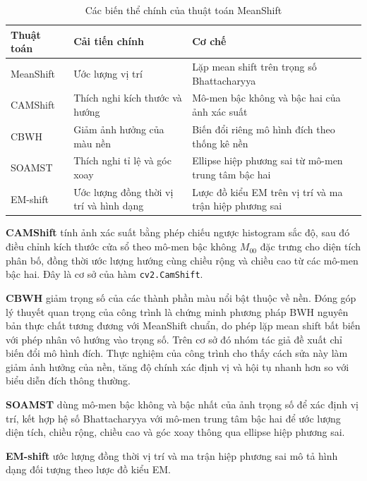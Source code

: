 \documentclass[12pt,a4paper]{article}
\numberwithin{equation}{section}
\begin{document}
\begin{table}[H]
\centering
\caption{Các biến thể chính của thuật toán MeanShift}
\label{tab:variants}
\small
\begin{tabular}{@{}lp{4.1cm}p{6.4cm}@{}}
\toprule
\textbf{Thuật toán} & \textbf{Cải tiến chính} & \textbf{Cơ chế} \\
\midrule
MeanShift~\cite{comaniciu2003} & Ước lượng vị trí & Lặp mean shift trên trọng số Bhattacharyya \\
CAMShift~\cite{bradski1998} & Thích nghi kích thước và hướng & Mô-men bậc không và bậc hai của ảnh xác suất \\
CBWH~\cite{ning2012cbwh} & Giảm ảnh hưởng của màu nền & Biến đổi riêng mô hình đích theo thống kê nền \\
SOAMST~\cite{ning2012soamst} & Thích nghi tỉ lệ và góc xoay & Ellipse hiệp phương sai từ mô-men trung tâm bậc hai \\
EM-shift~\cite{zivkovic2004} & Ước lượng đồng thời vị trí và hình dạng & Lược đồ kiểu EM trên vị trí và ma trận hiệp phương sai \\
\bottomrule
\end{tabular}
\end{table}

\textbf{CAMShift} tính ảnh xác suất bằng phép chiếu ngược histogram sắc độ, sau đó điều chỉnh kích
thước cửa sổ theo mô-men bậc không $M_{00}$ đặc trưng cho diện tích phân bố, đồng thời ước lượng
hướng cùng chiều rộng và chiều cao từ các mô-men bậc hai. Đây là cơ sở của hàm
\texttt{cv2.CamShift}.

\textbf{CBWH} giảm trọng số của các thành phần màu nổi bật thuộc về nền. Đóng góp lý thuyết quan
trọng của công trình là chứng minh phương pháp BWH nguyên bản thực chất tương đương với MeanShift
chuẩn, do phép lặp mean shift bất biến với phép nhân vô hướng vào trọng số. Trên cơ sở đó nhóm tác
giả đề xuất chỉ biến đổi mô hình đích. Thực nghiệm của công trình cho thấy cách sửa này làm giảm
ảnh hưởng của nền, tăng độ chính xác định vị và hội tụ nhanh hơn so với biểu diễn đích thông thường.

\textbf{SOAMST} dùng mô-men bậc không và bậc nhất của ảnh trọng số để xác định vị trí, kết hợp hệ
số Bhattacharyya với mô-men trung tâm bậc hai để ước lượng diện tích, chiều rộng, chiều cao và góc
xoay thông qua ellipse hiệp phương sai.

\textbf{EM-shift} ước lượng đồng thời vị trí và ma trận hiệp phương sai mô tả hình dạng đối tượng
theo lược đồ kiểu EM.

\end{document}
